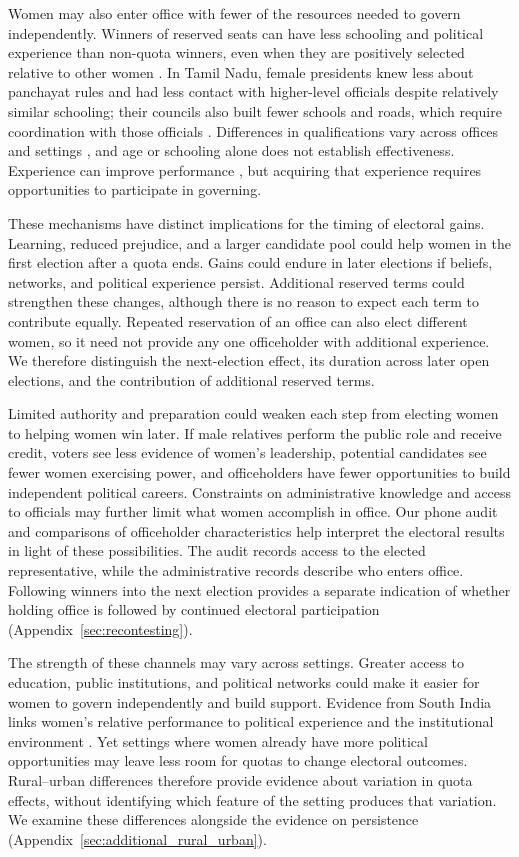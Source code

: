 \documentclass[11pt]{article}
\begin{document}
Women may also enter office with fewer of the resources needed to govern independently. Winners of reserved seats can have less schooling and political experience than non-quota winners, even when they are positively selected relative to other women \citep{ban2008tokenism}. In Tamil Nadu, female presidents knew less about panchayat rules and had less contact with higher-level officials despite relatively similar schooling; their councils also built fewer schools and roads, which require coordination with those officials \citep{gajwani2015gender}. Differences in qualifications vary across offices and settings \citep{soodQualifications}, and age or schooling alone does not establish effectiveness. Experience can improve performance \citep{ban2008tokenism, afridi2013learning}, but acquiring that experience requires opportunities to participate in governing.

These mechanisms have distinct implications for the timing of electoral gains. Learning, reduced prejudice, and a larger candidate pool could help women in the first election after a quota ends. Gains could endure in later elections if beliefs, networks, and political experience persist. Additional reserved terms could strengthen these changes, although there is no reason to expect each term to contribute equally. Repeated reservation of an office can also elect different women, so it need not provide any one officeholder with additional experience. We therefore distinguish the next-election effect, its duration across later open elections, and the contribution of additional reserved terms.

Limited authority and preparation could weaken each step from electing women to helping women win later. If male relatives perform the public role and receive credit, voters see less evidence of women's leadership, potential candidates see fewer women exercising power, and officeholders have fewer opportunities to build independent political careers. Constraints on administrative knowledge and access to officials may further limit what women accomplish in office. Our phone audit and comparisons of officeholder characteristics help interpret the electoral results in light of these possibilities. The audit records access to the elected representative, while the administrative records describe who enters office. Following winners into the next election provides a separate indication of whether holding office is followed by continued electoral participation (Appendix~\ref{sec:recontesting}).

The strength of these channels may vary across settings. Greater access to education, public institutions, and political networks could make it easier for women to govern independently and build support. Evidence from South India links women's relative performance to political experience and the institutional environment \citep{ban2008tokenism}. Yet settings where women already have more political opportunities may leave less room for quotas to change electoral outcomes. Rural--urban differences therefore provide evidence about variation in quota effects, without identifying which feature of the setting produces that variation. We examine these differences alongside the evidence on persistence (Appendix~\ref{sec:additional_rural_urban}).
\end{document}
